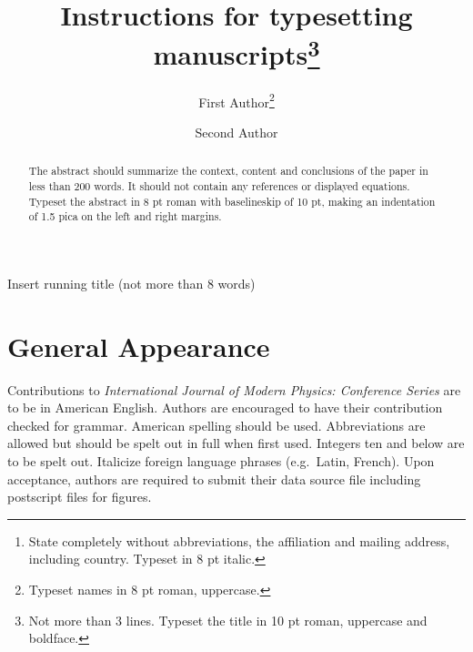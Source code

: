\documentclass{ws-ijmpcs}
\begin{document}
{Insert running title (not more than 8 words)}

%
\catchline{}{}{}{}{}
%

\title{Instructions for typesetting
manuscripts\footnote{Not more than
3 lines. Typeset the title in 10 pt roman, uppercase and
boldface.}}

\author{First Author\footnote{Typeset names in 8 pt roman, uppercase.}}

\address{University Department, University Name, Address\\
City, State ZIP/Zone,
Country\footnote{State completely without abbreviations, the
affiliation and mailing address, including country. Typeset in 8 pt
italic.}\\
first\_author@domain\_name}

\author{Second Author}

\address{Group, Laboratory, Address\\
City, State ZIP/Zone, Country\\
second\_author@domain\_name}

\maketitle

\begin{history}
\end{history}

\begin{abstract}
The abstract should summarize the context, content
and conclusions of the paper in less than 200 words. It should
not contain any references or displayed equations. Typeset the
abstract in 8 pt roman with baselineskip of 10 pt, making
an indentation of 1.5 pica on the left and right margins.
\end{abstract}


\section{General Appearance}	
Contributions to {\it International Journal of Modern Physics:
Conference Series} are to be in American English. Authors are
encouraged to have their contribution checked for grammar. American
spelling should be used. Abbreviations are allowed but should be spelt
out in full when first used. Integers ten and below are to be spelt
out.  Italicize foreign language phrases (e.g.~Latin, French).  Upon
acceptance, authors are required to submit their data source file
including postscript files for figures.
\end{document}
